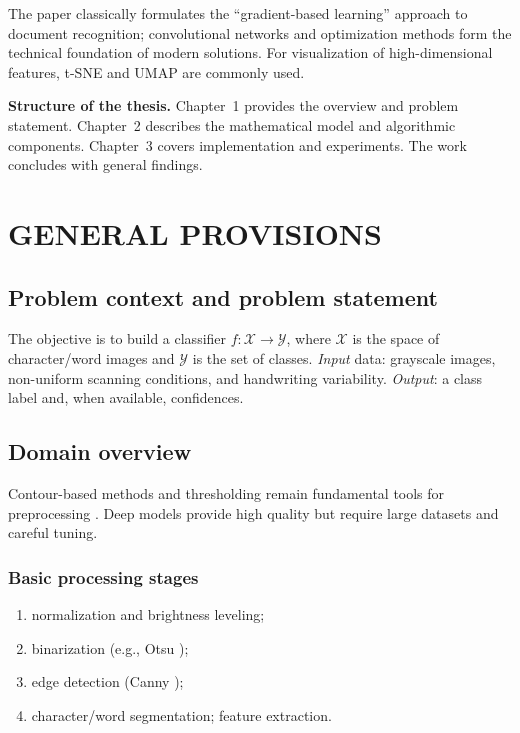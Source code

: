 \documentclass{article}
\begin{document}
The paper \cite{lecun1998gradient} classically formulates the ``gradient-based learning'' approach to document
recognition; convolutional networks \cite{krizhevsky2012imagenet,he2016deep} and optimization methods \cite{kingma2014adam}
form the technical foundation of modern solutions. For visualization of high-dimensional features,
t-SNE \cite{tsne2008} and UMAP \cite{umap2018} are commonly used.

\textbf{Structure of the thesis.} Chapter~1 provides the overview and problem statement. Chapter~2
describes the mathematical model and algorithmic components. Chapter~3 covers implementation and
experiments. The work concludes with general findings.

\section{GENERAL PROVISIONS}

\subsection{Problem context and problem statement}
The objective is to build a classifier $f:\mathcal{X}\to\mathcal{Y}$, where $\mathcal{X}$ is the space of
character/word images and $\mathcal{Y}$ is the set of classes. \textit{Input} data: grayscale images,
non-uniform scanning conditions, and handwriting variability. \textit{Output}: a class label and,
when available, confidences.

\subsection{Domain overview}
Contour-based methods and thresholding remain fundamental tools for preprocessing
\cite{otsu1979,canny1986}. Deep models \cite{lecun1998gradient,krizhevsky2012imagenet,he2016deep}
provide high quality but require large datasets and careful tuning.

\subsubsection{Basic processing stages}
\begin{enumerate}
  \item normalization and brightness leveling;
  \item binarization (e.g., Otsu \cite{otsu1979});
  \item edge detection (Canny \cite{canny1986});
  \item character/word segmentation; feature extraction.
\end{enumerate}
\end{document}
